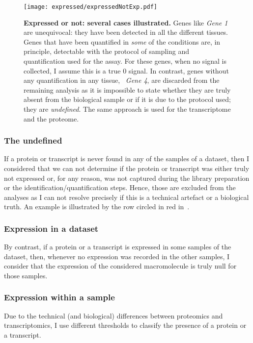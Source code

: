 \begin{figure}[!htb]
    \texttt{[image: expressed/expressedNotExp.pdf]}\centering
      \caption[Expressed or not: several cases illustrated]
      {\label{fig:DefineExpression}\textbf{Expressed or not: several cases
      illustrated.}\smallbreak{} Genes like \emph{Gene 1} are unequivocal: they have been
      detected in all the different tissues. Genes that have been quantified in
      \emph{some} of the conditions are, in principle, detectable with the
      protocol of sampling and quantification used for the assay.
      For these genes, when no signal is collected, I assume this is a true $0$ signal.
      In contrast, genes without any quantification
      in any tissue, \eg\ \emph{Gene 4}, are discarded from the remaining analysis as
      it is impossible to state
      whether they are truly absent from the biological sample or if it is due
      to the protocol used; they are \emph{undefined}. The same approach is used
      for the transcriptome and the proteome.}
\end{figure}

\subsubsection{The undefined}%
\label{subsec:ExpressedOrNot-undefined}
If a protein or transcript is never found in any of the samples of a dataset,
then I considered that we can not determine if the protein or transcript was
either truly not expressed or, for any reason, was not captured during the library
preparation or the identification/quantification steps. Hence, those are
excluded from the analyses as I can not resolve precisely if this is a
technical artefact or a biological truth. An example is illustrated by the row
circled in red in~.

\subsubsection{Expression in a dataset}\label{subsec:ExpressedOrNot--expDataset}
By contrast, if a protein or a transcript is expressed in some samples of the
dataset, then, whenever no expression was recorded in the other
samples, I consider that the expression of the considered macromolecule is truly
null for those samples.

\subsubsection{Expression within a sample}
Due to the technical (and biological) differences between proteomics and
transcriptomics, I use different thresholds to classify the presence of a protein
or a transcript.

